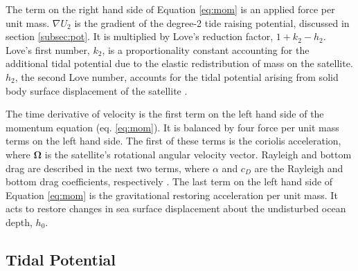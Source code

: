 The term on the right hand side of Equation \ref{eq:mom} is an applied force per unit mass. $\nabla U_2$ is the gradient of the degree-2 tide raising potential, discussed in section \ref{subsec:pot}. It is multiplied by Love's reduction factor, $1 + k_2 - h_2$. Love's first number, $k_2$, is a proportionality constant accounting for the additional tidal potential due to the elastic redistribution of mass on the satellite. $h_2$, the second Love number, accounts for the tidal potential arising from solid body surface displacement of the satellite \citep{love1911some}.

The time derivative of velocity is the first term on the left hand side of the momentum equation (eq. \ref{eq:mom}). It is balanced by four force per unit mass terms on the left hand side. The first of these terms is the coriolis acceleration, where $\bm{\Omega}$ is the satellite's rotational angular velocity vector. Rayleigh and bottom drag are described in the next two terms, where $\alpha$ and $c_D$ are the Rayleigh and bottom drag coefficients, respectively \citep{sears1995tidal,chen2013tidal}. The last term on the left hand side of Equation \ref{eq:mom} is the gravitational restoring acceleration per unit mass. It acts to restore changes in sea surface displacement about the undisturbed ocean depth, $h_0$.

\subsection{Tidal Potential \label{subsec:pot}}

